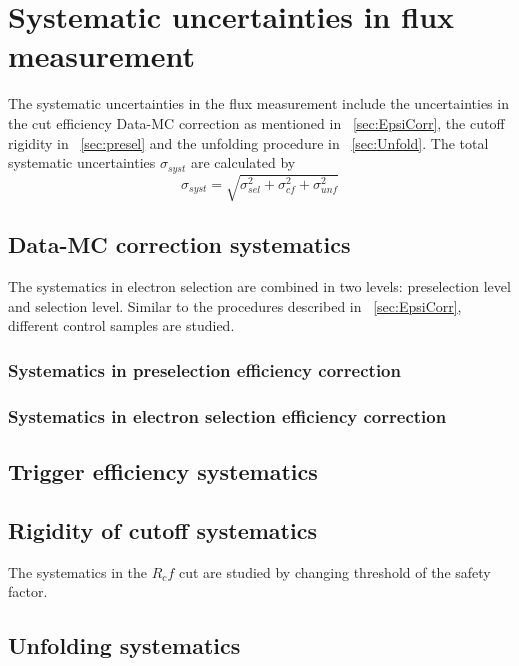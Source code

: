 \section[Syst. uncertainties]{Systematic uncertainties in flux measurement}
The systematic uncertainties in the flux measurement include the uncertainties in the cut efficiency Data-MC correction as mentioned in ~\ref{sec:EpsiCorr}, the cutoff rigidity in ~\ref{sec:presel} and the unfolding procedure in ~\ref{sec:Unfold}. The total systematic uncertainties $\sigma_{syst}$ are calculated by
\begin{equation}
\sigma_{syst}=\sqrt{\sigma_{sel}^2+\sigma_{cf}^2+\sigma_{unf}^2}
\end{equation}

\subsection{Data-MC correction systematics}
The systematics in electron selection are combined in two levels: preselection level and  selection level. Similar to the procedures described in ~\ref{sec:EpsiCorr}, different control samples are studied.
\subsubsection{Systematics in preselection efficiency correction}

\subsubsection{Systematics in electron selection efficiency correction}

\subsection{Trigger efficiency systematics}

\subsection{Rigidity of cutoff systematics}
The systematics in the $R_cf$ cut are studied by changing threshold of the safety factor.

\subsection{Unfolding systematics}